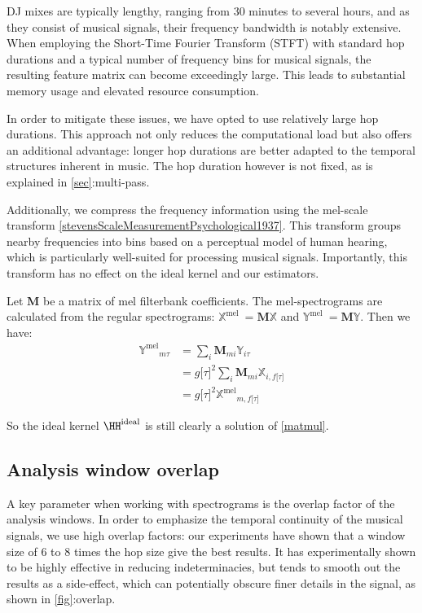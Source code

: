 DJ mixes are typically lengthy, ranging from 30 minutes to several
hours, and as they consist of musical signals, their frequency bandwidth
is notably extensive. When employing the Short-Time Fourier Transform
(STFT) with standard hop durations and a typical number of frequency
bins for musical signals, the resulting feature matrix can become
exceedingly large. This leads to substantial memory usage and elevated
resource consumption.

In order to mitigate these issues, we have opted to use relatively large
hop durations. This approach not only reduces the computational load but
also offers an additional advantage: longer hop durations are better
adapted to the temporal structures inherent in music. The hop duration
however is not fixed, as is explained in
\hyperref[sec]{{[}sec{]}}:multi-pass.

Additionally, we compress the frequency information using the mel-scale
transform
\hyperref[stevensScaleMeasurementPsychological1937]{{[}stevensScaleMeasurementPsychological1937{]}}.
This transform groups nearby frequencies into bins based on a perceptual
model of human hearing, which is particularly well-suited for processing
musical signals. Importantly, this transform has no effect on the ideal
kernel and our estimators.

Let \(\mathbf{M}\) be a matrix of mel filterbank coefficients. The
mel-spectrograms are calculated from the regular spectrograms:
\({\mathbb{X}}^{\text{mel }} = \mathbf{M}{\mathbb{X}}\) and
\({\mathbb{Y}}^{\text{mel }} = \mathbf{M}{\mathbb{Y}}\). Then we have:
\[\begin{aligned}
{{\mathbb{Y}}^{\text{mel}}}_{m\tau} & = \sum_{i}\mathbf{M}_{mi}{\mathbb{Y}}_{i\tau} \\
 & = g\lbrack\tau\rbrack^{2}\sum_{i}\mathbf{M}_{mi}{\mathbb{X}}_{i,f\lbrack\tau\rbrack} \\
 & = g\lbrack\tau\rbrack^{2}{{\mathbb{X}}^{\text{mel}}}_{m,f\lbrack\tau\rbrack}
\end{aligned}\]

So the ideal kernel \(\HH^{\text{ideal}}\) is still clearly a
solution of \hyperref[matmul]{{[}matmul{]}}.

\subsection{Analysis window overlap}

A key parameter when working with spectrograms is the overlap factor of
the analysis windows. In order to emphasize the temporal continuity of
the musical signals, we use high overlap factors: our experiments have
shown that a window size of 6 to 8 times the hop size give the best
results. It has experimentally shown to be highly effective in reducing
indeterminacies, but tends to smooth out the results as a side-effect,
which can potentially obscure finer details in the signal, as shown in
\hyperref[fig]{{[}fig{]}}:overlap.

